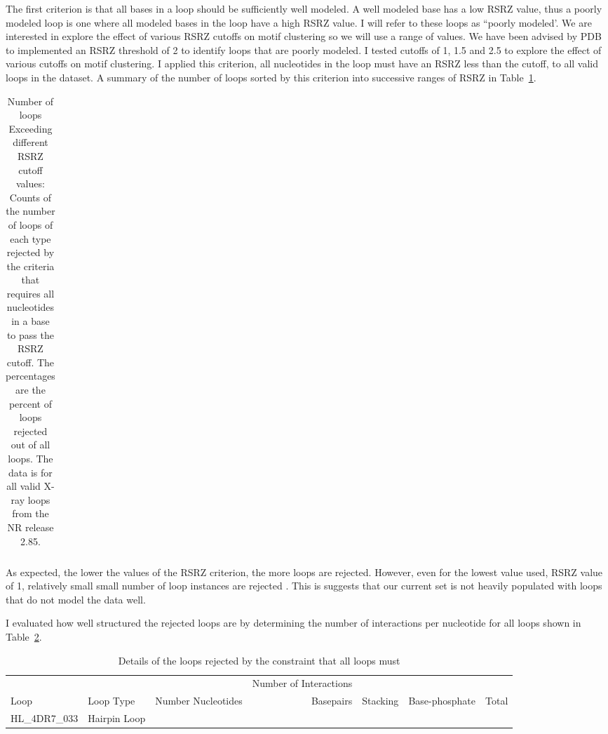 The first criterion is that all bases in a loop should be sufficiently well
modeled. A well modeled base has a low RSRZ value, thus a poorly modeled loop is
one where all modeled bases in the loop have a high RSRZ value. I will refer to
these loops as ``poorly modeled’. We are interested in explore the effect of
various RSRZ cutoffs on motif clustering so we will use a range of values. We
have been advised by PDB to implemented an RSRZ threshold of 2 to identify loops
that are poorly modeled. I tested cutoffs of 1, 1.5 and 2.5 to explore the
effect of various cutoffs on motif clustering. I applied this criterion, all
nucleotides in the loop must have an RSRZ less than the cutoff, to all valid
loops in the dataset. A summary of the number of loops sorted by this criterion
into successive ranges of RSRZ in Table~\ref{tab:cutoffs-reject-summary}.

\begin{table}
  \begin{tabular}{lr}
    \toprule
    \midrule
    \bottomrule
  \end{tabular}
  \caption{Number of loops Exceeding different RSRZ cutoff values: Counts of the
    number of loops of each type rejected by the criteria that requires all
    nucleotides in a base to pass the RSRZ cutoff. The percentages are the
    percent of loops rejected out of all loops. The data is for all valid X-ray
  loops from the NR release 2.85.}
  \label{tab:cutoffs-reject-summary}
\end{table}

As expected, the lower the values of the RSRZ criterion, the more loops are
rejected. However, even for the lowest value used, RSRZ value of 1, relatively
small small number of loop instances are rejected . This is suggests that our
current set is not heavily populated with loops that do not model the data well.

I evaluated how well structured the rejected loops are by determining the number
of interactions per nucleotide for all loops shown in
Table~\ref{tab:all-bad-structuring}.

\begin{table}
  \begin{tabular}{lllrrrr}
    \toprule
    & & & Number of Interactions & & & \\
    Loop & 
      Loop Type & 
      Number Nucleotides & 
      Basepairs & 
      Stacking &
      Base-phosphate &
      Total \\
    \midrule
    HL\_4DR7\_033 & Hairpin Loop & & & & & \\
    \bottomrule
  \end{tabular}
  \caption{Details of the loops rejected by the constraint that all loops must }
  \label{tab:all-bad-structuring}
\end{table}

